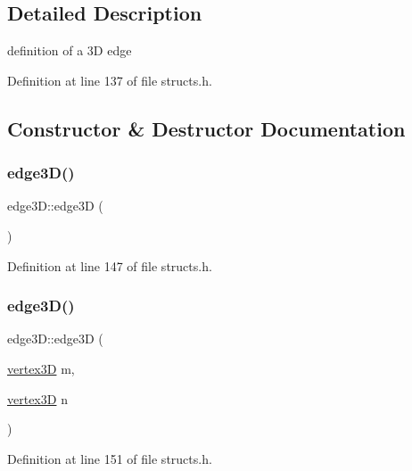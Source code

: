 \subsection{Detailed Description}
definition of a 3D edge 

Definition at line 137 of file structs.\+h.



\subsection{Constructor \& Destructor Documentation}
\mbox{\label{structedge3_d_a91d257e72d692950510c549e26274cd4}} 
\subsubsection{\texorpdfstring{edge3\+D()}{edge3D()}\hspace{0.1cm}{\footnotesize\ttfamily [1/2]}}
{\footnotesize\ttfamily edge3\+D\+::edge3D (\begin{DoxyParamCaption}{ }\end{DoxyParamCaption})\hspace{0.3cm}{\ttfamily [inline]}}



Definition at line 147 of file structs.\+h.

\mbox{\label{structedge3_d_a56bba51f4351182ea95d186db5469671}} 
\subsubsection{\texorpdfstring{edge3\+D()}{edge3D()}\hspace{0.1cm}{\footnotesize\ttfamily [2/2]}}
{\footnotesize\ttfamily edge3\+D\+::edge3D (\begin{DoxyParamCaption}\item[{\mbox{\hyperlink{structvertex3_d}{vertex3D}}}]{m,  }\item[{\mbox{\hyperlink{structvertex3_d}{vertex3D}}}]{n }\end{DoxyParamCaption})\hspace{0.3cm}{\ttfamily [inline]}}



Definition at line 151 of file structs.\+h.




